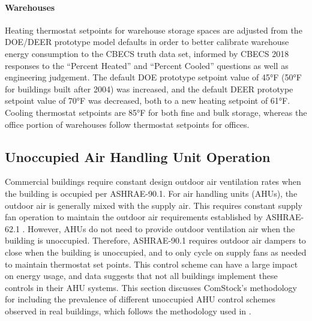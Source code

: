 \paragraph{Warehouses}

Heating thermostat setpoints for warehouse storage spaces are adjusted from the DOE/DEER prototype model defaults in order to better calibrate warehouse energy consumption to the CBECS truth data set, informed by CBECS 2018 \citep{eia2018cbecs} responses to the ``Percent Heated'' and ``Percent Cooled'' questions as well as engineering judgement. The default DOE prototype setpoint value of 45°F (50°F for buildings built after 2004) was increased, and the default DEER prototype setpoint value of 70°F was decreased, both to a new heating setpoint of 61°F. Cooling thermostat setpoints are 85°F for both fine and bulk storage, whereas the office portion of warehouses follow thermostat setpoints for offices.


\pagebreak
\subsection{Unoccupied Air Handling Unit Operation}
\label{sec:unoccupied_ahu_operation}

Commercial buildings require constant design outdoor air ventilation rates when the building is occupied per ASHRAE-90.1. For air handling units (AHUs), the outdoor air is generally mixed with the supply air. This requires constant supply fan operation to maintain the outdoor air requirements established by ASHRAE-62.1 \citep{ashrae_62.1_2004}. However, AHUs do not need to provide outdoor ventilation air when the building is unoccupied. Therefore, ASHRAE-90.1 requires outdoor air dampers to close when the building is unoccupied, and to only cycle on supply fans as needed to maintain thermostat set points. This control scheme can have a large impact on energy usage, and data suggests that not all buildings implement these controls in their AHU systems. This section discusses ComStock's methodology for including the prevalence of different unoccupied AHU control schemes observed in real buildings, which follows the methodology used in \cite{unocc_hvac_paper}.

